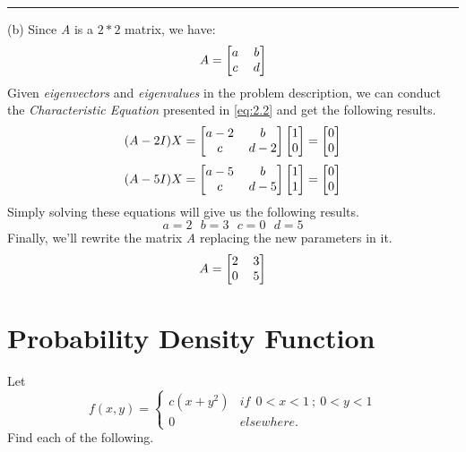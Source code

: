 \documentclass[12pt]{article}
\numberwithin{equation}{section}
\numberwithin{table}{section}
\numberwithin{figure}{section}
\begin{document}
\noindent\rule{\textwidth}{.5pt}
(b) Since \textit{A} is a $2*2$ matrix, we have:
$$
	A = 
	\renewcommand\arraystretch{1}
	\setlength\arraycolsep{6pt}
	\begin{bmatrix}
	a & b\\	
	c & d\\
	\end{bmatrix}
$$
Given \textit{eigenvectors} and \textit{eigenvalues} in the problem description, we can conduct the \textit{Characteristic Equation} presented in \ref{eq:2.2} and get the following results.
$$
(A - 2 I)X = 
\renewcommand\arraystretch{1}
\setlength\arraycolsep{6pt}
\begin{bmatrix}
a-2 & b\\	
c & d-2\\
\end{bmatrix}
\begin{bmatrix}
1\\
0 \\
\end{bmatrix} = \begin{bmatrix}
0\\
0 \\
\end{bmatrix}
$$
$$
(A - 5 I)X = 
\renewcommand\arraystretch{1}
\setlength\arraycolsep{6pt}
\begin{bmatrix}
a-5 & b\\	
c & d-5\\
\end{bmatrix}
\begin{bmatrix}
1\\
1 \\
\end{bmatrix} = \begin{bmatrix}
0\\
0 \\
\end{bmatrix}
$$
Simply solving these equations will give us the following results.
$$
	\boxed{a = 2}
	\ \ \
	\boxed{b = 3}
	\ \ \
	\boxed{c = 0}
	\ \ \
	\boxed{d = 5}
$$
Finally, we'll rewrite the matrix \textit{A} replacing the new parameters in it.
$$
A = 
\renewcommand\arraystretch{1}
\setlength\arraycolsep{6pt}
\begin{bmatrix}
2 & 3\\	
0 & 5\\
\end{bmatrix}
$$
\newpage
\section{Probability Density Function}
Let
\renewcommand\arraystretch{1.2}
\setlength\arraycolsep{10pt}
\[f(x, y) = \left\{
\begin{array}{lr}
c(x + y^2) &  if \ \ 0 < x < 1\ ;\ 0 < y < 1\\
0 &  elsewhere.
\end{array}
\right.
\]
Find each of the following.
\end{document}
